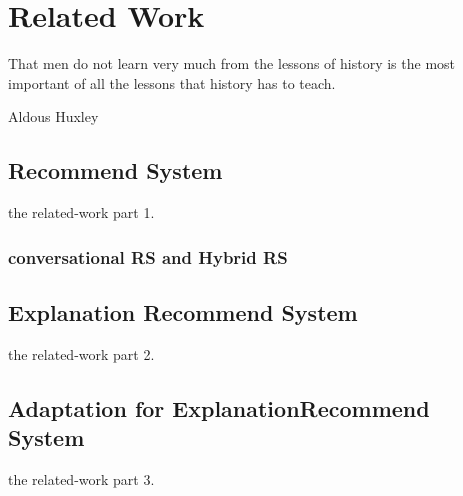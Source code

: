 \section{Related Work}
\label{ch:related-work}

\epigraph{That men do not learn very much from the lessons of history is the most important of all the lessons that history has to teach.}{Aldous Huxley}

\subsection{Recommend System}

the related-work part 1.
	\subsubsection{conversational RS and Hybrid RS}

\subsection{Explanation Recommend System}

the related-work part 2.

\subsection{Adaptation for ExplanationRecommend System}

the related-work part 3.

\cleardoublepage